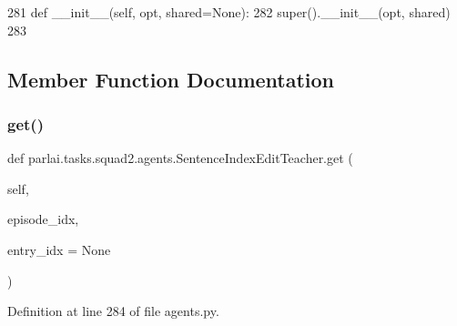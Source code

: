 \begin{DoxyCode}
281     \textcolor{keyword}{def }\_\_init\_\_(self, opt, shared=None):
282         super().\_\_init\_\_(opt, shared)
283 
\end{DoxyCode}


\subsection{Member Function Documentation}
\mbox{\label{classparlai_1_1tasks_1_1squad2_1_1agents_1_1SentenceIndexEditTeacher_afb925573397b65655e1375f2f501b545}} 
\subsubsection{\texorpdfstring{get()}{get()}}
{\footnotesize\ttfamily def parlai.\+tasks.\+squad2.\+agents.\+Sentence\+Index\+Edit\+Teacher.\+get (\begin{DoxyParamCaption}\item[{}]{self,  }\item[{}]{episode\+\_\+idx,  }\item[{}]{entry\+\_\+idx = {\ttfamily None} }\end{DoxyParamCaption})}



Definition at line 284 of file agents.\+py.


